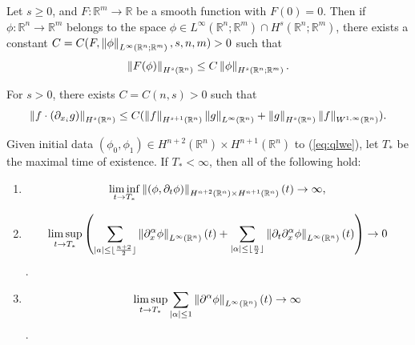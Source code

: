 \documentclass{article}
\begin{document}
\begin{lemma}
	Let $s \geq 0$, and $F: \mathbb{R}^{m} \to \mathbb{R}$ be a smooth function with $F(0) =0$. Then if $\phi: \mathbb{R}^{n} \to \mathbb{R}^{m}$ belongs to the space $\phi \in L^{\infty}(\mathbb{R}^{n}; \mathbb{R}^{m}) \cap H^{s}(\mathbb{R}^{n}; \mathbb{R}^{m})$, there exists a constant $C = C(F, \left\Vert \phi \right\Vert_{L^{\infty}(\mathbb{R}^{n}; \mathbb{R}^{m})}, s, n, m) > 0$ such that 
	\begin{equation*}
		\left\Vert F(\phi) \right\Vert_{H^{s}(\mathbb{R}^{n})} \leq C\left\Vert \phi \right\Vert_{H^{s}(\mathbb{R}^{n};\mathbb{R}^{m})}. 
	\end{equation*}
\end{lemma} 
\begin{lemma}
	For $s > 0$, there exists $C = C(n, s) > 0$ such that 
	\begin{equation*}
		\left\Vert f \cdot (\partial_{x_{i}}g) \right\Vert_{H^{s}(\mathbb{R}^{n})} \leq C(\left\Vert f \right\Vert_{H^{s + 1}(\mathbb{R}^{n})}\left\Vert g \right\Vert_{L^{\infty}(\mathbb{R}^{n})} + \left\Vert g \right\Vert_{H^{s}(\mathbb{R}^{n})}\left\Vert f \right\Vert_{W^{1,\infty}(\mathbb{R}^{n})}). 
	\end{equation*}
\end{lemma} 

\begin{theorem}
	Given initial data $(\phi_{0}, \phi_{1}) \in H^{n + 2}(\mathbb{R}^{n}) \times H^{n + 1}(\mathbb{R}^{n})$ to (\ref{eq:qlwe}), let $T_{\ast}$ be the maximal time of existence. If $T_{\ast} < \infty$, then all of the following hold: \vspace{-0.25cm}
	\begin{enumerate}[itemsep=-2pt,label = (\roman{*})]
		\item $$\liminf_{t \to T_{\ast}}\left\Vert (\phi, \partial_{t}\phi) \right\Vert_{H^{n + 2}(\mathbb{R}^{n}) \times H^{n + 1}(\mathbb{R}^{n})}(t) \to \infty,$$
		\item $$\limsup_{t \to T_{\ast}}\left(\sum_{|a| \leq \lfloor \frac{n + 2}{2}\rfloor}\left\Vert \partial_{x}^{\alpha}\phi \right\Vert_{L^{\infty}(\mathbb{R}^{n})}(t) + \sum_{|\alpha| \leq \lfloor \frac{n}{2}\rfloor}\left\Vert \partial_{t}\partial_{x}^{\alpha}\phi \right\Vert_{L^{\infty}(\mathbb{R}^{n})}(t)\right) \to 0$$. 
		\item $$\limsup_{t \to T_{\ast}}\sum_{|\alpha|\leq 1}\left\Vert \partial^{\alpha}\phi \right\Vert_{L^{\infty}(\mathbb{R}^{n})}(t) \to \infty$$. 
	\end{enumerate}
\end{theorem}
\end{document}
